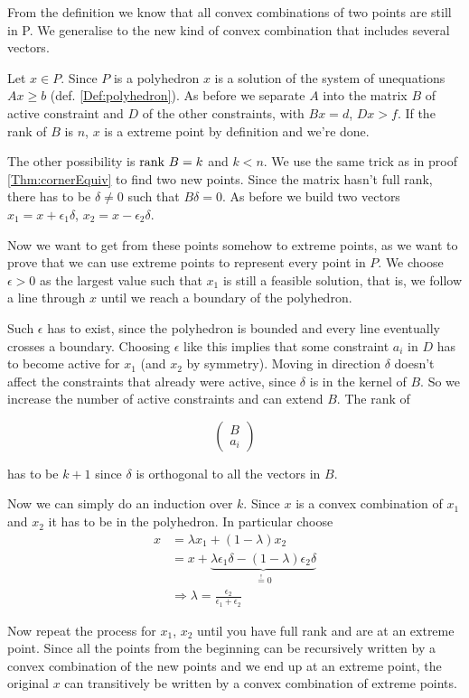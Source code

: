 \begin{pr}
From the definition we know that all convex combinations of two points are still in P. We generalise to the new kind of convex combination that includes several vectors.

Let $x\in P$. Since $P$ is a polyhedron $x$ is a solution of the system of unequations $Ax\geq b$ (def. \ref{Def:polyhedron}). As before we separate $A$ into the matrix $B$ of active constraint and $D$ of the other constraints, with $Bx=d$, $Dx>f$. If the rank of $B$ is $n$, $x$ is a extreme point by definition and we're done. 

The other possibility is $\mbox{rank } B=k$ and $k<n$. We use the same trick as in proof \ref{Thm:cornerEquiv} to find two new points. Since the matrix hasn't full rank, there has to be $\delta \neq 0$ such that $B\delta = 0$. As before we build two vectors $x_1 = x+ \epsilon_1 \delta$, $x_2=x-\epsilon_2 \delta$. 

Now we want to get from these points somehow to extreme points, as we want to prove that we can use extreme points to represent every point in $P$. We choose $\epsilon>0$ as the largest value such that $x_1$ is still a feasible solution, that is, we follow a line through $x$ until we reach a boundary of the polyhedron. 

Such $\epsilon$ has to exist, since the polyhedron is bounded and every line eventually crosses a boundary. Choosing $\epsilon$ like this implies that some constraint $a_i$ in $D$ has to become active for $x_1$ (and $x_2$ by symmetry). Moving in direction $\delta$ doesn't affect the constraints that already were active, since $\delta$ is in the kernel of $B$. So we increase the number of active constraints and can extend $B$. The rank of

\[\begin{pmatrix}B\\ a_i\end{pmatrix}\]

has to be $k+1$ since $\delta$ is orthogonal to all the vectors in $B$. %

Now we can simply do an induction over $k$. Since $x$ is a convex combination of $x_1$ and $x_2$ it has to be in the polyhedron. In particular choose
\begin{align*}
x&=\lambda x_1+(1-\lambda)x_2\\
&=x+\underbrace{\lambda \epsilon_1\delta -(1-\lambda)\epsilon_2\delta}_{\stackrel{!}{=}0}\\
&\Rightarrow \lambda = \frac{\epsilon_2}{\epsilon_1+\epsilon_2}
\end{align*}

Now repeat the process for $x_1$, $x_2$ until you have full rank and are at an extreme point. Since all the points from the beginning can be recursively written by a convex combination of the new points and we end up at an extreme point, the original $x$ can transitively be written by a convex combination of extreme points.
\end{pr}

